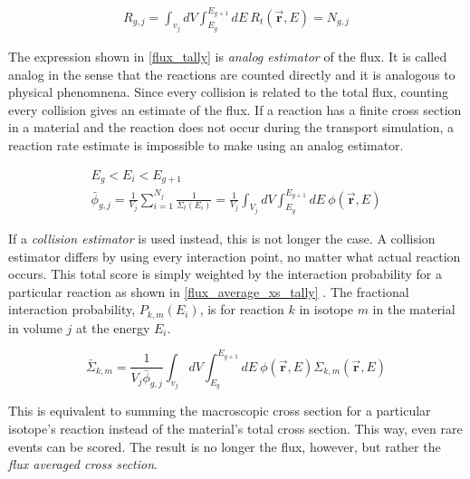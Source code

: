 \begin{equation}
\label{RR_coll}
\begin{gathered}
R_{g,j} = \int_{v_j} dV \int_{E_g}^{E_{g+1}} dE \: R_t(\boldsymbol{\vec{r}},E) = N_{g,j}
\end{gathered}
\end{equation}

The expression shown in \eqref{flux_tally} is \emph{analog estimator} of the flux.  It is called analog in the sense that the reactions are counted directly and it is analogous to physical phenomnena.  Since every collision is related to the total flux, counting every collision gives an estimate of the flux.  If a reaction has a finite cross section in a material and the reaction does not occur during the transport simulation, a reaction rate estimate is impossible to make using an analog estimator. 

\begin{equation}
\label{flux_tally}
\begin{gathered}
E_g < E_i < E_{g+1} \\
\bar{\phi}_{g,j} =  \frac{1}{V_j} \sum_{i=1}^{N_j} \frac{1}{\Sigma_t(E_i)} =  \frac{1}{V_j} \int_{V_j} dV \int_{E_g}^{E_{g+1}} dE \: \phi(\boldsymbol{\vec{r}},E) 
\end{gathered}
\end{equation}

If a \emph{collision estimator} is used instead, this is not longer the case.  A collision estimator differs by using every interaction point, no matter what actual reaction occurs.  This total score is simply weighted by the interaction probability for a particular reaction as shown in \eqref{flux_average_xs_tally} \cite{jaakko}.  The fractional interaction probability, $P_{k,m}(E_i)$, is for reaction $k$ in isotope $m$ in the material in volume $j$ at the energy $E_i$.

\begin{equation}
\label{flux_average_xs}
\bar{\Sigma}_{k,m} =  \frac{1}{V_j \bar{\phi}_{g,j} } \int_{v_j} dV \int_{E_g}^{E_{g+1}} dE \: \phi(\boldsymbol{\vec{r}},E) \Sigma_{k,m}(\boldsymbol{\vec{r}},E)
\end{equation}

This is equivalent to summing the macroscopic cross section for a particular isotope's reaction instead of the material's total cross section.  This way, even rare events can be scored.  The result is no longer the flux, however, but rather the \emph{flux averaged cross section}.  

